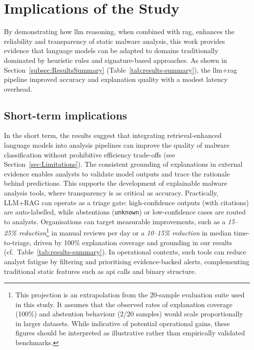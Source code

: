\section{Implications of the Study}\label{sec:Implications}
By demonstrating how \gls{llm} reasoning, when combined with \gls{rag}, enhances the reliability
and transparency of static malware analysis, this work provides evidence that language models can
be adapted to domains traditionally dominated by heuristic rules and signature-based approaches. As
shown in Section~\ref{subsec:ResultsSummary} (Table~\ref{tab:results-summary}), the
\gls{llm}+\gls{rag} pipeline improved accuracy and explanation quality with a modest latency
overhead.

\subsection{Short-term implications}\label{subsec:ShortTermImplications}
In the short term, the results suggest that integrating retrieval-enhanced language models into
analysis pipelines can improve the quality of malware classification without prohibitive efficiency
trade-offs (see Section~\ref{sec:Limitations}). The consistent grounding of explanations in
external evidence enables analysts to validate model outputs and trace the rationale behind
predictions. This supports the development of explainable malware analysis tools, where
transparency is as critical as accuracy. Practically, LLM+RAG can operate as a triage gate:
high-confidence outputs (with citations) are auto-labelled, while abstentions (\texttt{unknown}) or
low-confidence cases are routed to analysts. Organisations can target measurable improvements, such
as a \textit{15--25\% reduction}\footnote{This projection is an extrapolation from the 20-sample
    evaluation suite used in this study. It assumes that the observed rates of explanation coverage
    (100\%) and abstention behaviour (2/20 samples) would scale proportionally in larger datasets.
    While indicative of potential operational gains, these figures should be interpreted as
    illustrative rather than empirically validated benchmarks.} in manual reviews per day or a
\textit{10--15\% reduction} in median time-to-triage, driven by 100\% explanation coverage and
grounding in our results (cf.~Table~\ref{tab:results-summary}). In operational contexts, such tools
can reduce analyst fatigue by filtering and prioritising evidence-backed alerts, complementing
traditional static features such as \gls{api} calls and binary structure.

